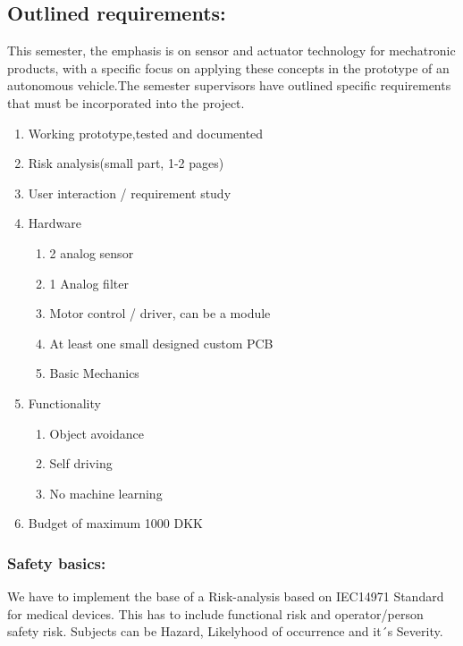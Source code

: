 \documentclass[../report.tex]{subfiles}
\begin{document}
\subsection{Outlined requirements:}
This semester, the emphasis is on sensor and actuator technology for
mechatronic products, with a specific focus on applying these concepts in the
prototype of an autonomous vehicle.The semester supervisors have outlined
specific requirements that must be incorporated into the project.
\begin{enumerate}
    \item Working prototype,tested and documented
    \item Risk analysis(small part, 1-2 pages)
    \item User interaction / requirement study
    \item Hardware\begin{enumerate}
        \item 2 analog sensor
        \item 1 Analog filter
        \item Motor control / driver, can be a module
        \item At least one small designed custom PCB
        \item Basic Mechanics
    \end{enumerate}
    \item Functionality\begin{enumerate}
        \item Object avoidance
        \item Self driving
        \item No machine learning
    \end{enumerate}
    \item Budget of maximum 1000 DKK
\end{enumerate}
\subsubsection{Safety basics:}
We have to implement the base of a Risk-analysis based on IEC14971 Standard for medical devices.
This has to include functional risk and operator/person safety risk. Subjects can be Hazard, Likelyhood
of occurrence and it´s Severity.
\end{document}
